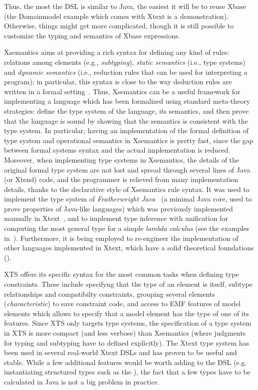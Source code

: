 Thus, the most the DSL is similar to Java, the easiest it will be to reuse Xbase
(the Domainmodel example which comes with Xtext is a demonstration).  Otherwise,
things might get more complicated, though it is still possible to customize the
typing and semantics of Xbase expressions.

Xsemantics aims at providing a rich syntax for defining any kind of rules:
relations among elements (e.g., \emph{subtyping}), \emph{static semantics}
(i.e., type systems) and \emph{dynamic semantics} (i.e., reduction rules that
can be used for interpreting a program); in particular, this syntax is close to
the way deduction rules are written in a formal
setting~\cite{hindley:1997a,Pierce02}.  Thus, Xsemantics can be a useful
framework for implementing a language which has been formalized using standard
meta-theory strategies: define the type system of the language, its semantics,
and then prove that the language is sound by showing that the semantics is
consistent with the type system.  In particular, having an implementation of the
formal definition of type system and operational semantics in Xsemantics is
pretty fast, since the gap between formal systems syntax and the actual
implementation is reduced. Moreover, when implementing type systems in
Xsemantics, the details of the original formal type system are not lost and
spread through several lines of Java (or Xtend) code, and the programmer is
relieved from many implementation details, thanks to the declarative style of
Xsemantics rule syntax. It was used to implement the type system of
\emph{Featherweight Java}~\cite{IgarashiPierceWadler:TOPLAS-2001} (a minimal
Java core, used to prove properties of Java-like languages) which was previously
implemented manually in Xtext~\cite{Bet10}, and to implement type inference with
unification for computing the most general type for a simple \emph{lambda
calculus} (see the examples in~\cite{lbts}).  Furthermore, it is being employed
to re-engineer the implementation of other languages implemented in Xtext, which
have a solid theoretical foundations (\cite{CompDelta,TraitRecordJ-SCP}).

XTS offers its specific syntax for the most common tasks when defining type
constraints. These include specifyng that the type of an element is itself,
subtype relationships and compatibilty constraints, grouping several elements
(\emph{characteristic}) to save constraint code, and access to EMF features of
model elements which allows to specify that a model element has the type of one
of its features.  Since XTS only targets type systems, the specification of a
type system in XTS is more compact (and less verbose) than Xsemantics (where
judgments for typing and subtyping have to defined explicitly).
The Xtext type system has been used in several real-world Xtext DSLs and has
proven to be useful and stable. While a few additional features would be worth
adding to the DSL (e.g. instantiating structured types such as the
), the fact that a few types have to be calculated in Java is not
a big problem in practice.

